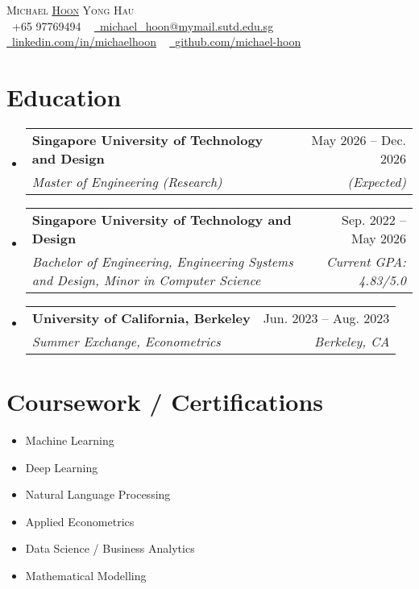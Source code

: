 \documentclass[letterpaper,11pt]{article}
\makeatletter
\newcommand{\resumeSubheading}[4]{
  \vspace{-2pt}\item
    \begin{tabular*}{1.0\textwidth}[t]{l@{\extracolsep{\fill}}r}
      \textbf{#1} & \small #2 \\
      \textit{\small#3} & \textit{\small #4} \\
    \end{tabular*}\vspace{-7pt}
}
\newcommand{\resumeSubHeadingListStart}{\begin{itemize}[leftmargin=0.0in, label={}]}
\newcommand{\resumeSubHeadingListEnd}{\end{itemize}}
\makeatother
\begin{document}
\begin{center}
    {\Huge \scshape Michael \underline{Hoon} Yong Hau} \\ \vspace{8pt}
    \small \raisebox{-0.1\height}\faPhone\ +65 97769494 ~ \href{mailto:michael_hoon@mymail.sutd.edu.sg}{\raisebox{-0.2\height}\faEnvelope\  \underline{michael\_hoon@mymail.sutd.edu.sg}} ~ 
    \href{https://linkedin.com/in/michaelhoon}{\raisebox{-0.2\height}\faLinkedin\ \underline{linkedin.com/in/michaelhoon}}  ~
    \href{https://github.com/michael-hoon}{\raisebox{-0.2\height}\faGithub\ \underline{github.com/michael-hoon}}
\end{center}


\section{Education}
  \resumeSubHeadingListStart
    \resumeSubheading
      {Singapore University of Technology and Design}{May 2026 -- Dec. 2026}
      {Master of Engineering (Research)}{(Expected)}
    \resumeSubheading
      {Singapore University of Technology and Design}{Sep. 2022 -- May 2026}
      {Bachelor of Engineering, Engineering Systems and Design, Minor in Computer Science}{Current GPA: 4.83/5.0}
    \resumeSubheading
    {University of California, Berkeley}{Jun. 2023 -- Aug. 2023}
    {Summer Exchange, Econometrics}{Berkeley, CA}
  \resumeSubHeadingListEnd

\section{Coursework / Certifications}
        \begin{multicols}{3}
            \begin{itemize}[itemsep=-5pt, parsep=3pt]
                \item\small Machine Learning  
                \item Deep Learning
                \item Natural Language Processing
                \item Applied Econometrics
                \item Data Science / Business Analytics 
                \item Mathematical Modelling
            \end{itemize}
        \end{multicols}
\end{document}
